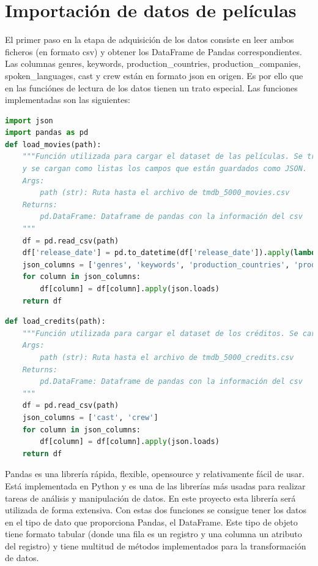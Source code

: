 \newpage
\section{Importación de datos de películas}

El primer paso en la etapa de adquisición de los datos consiste en leer ambos ficheros (en formato csv) y obtener los DataFrame de Pandas correspondientes. Las columnas genres, keywords, production\_countries, production\_companies, spoken\_languages, cast y crew están en formato json en origen. Es por ello que en las funciónes de lectura de los datos tienen un trato especial. Las funciones implementadas son las siguientes:

\begin{lstlisting}[language=Python, caption=Lectura de los datos del fichero de películas.]
import json
import pandas as pd
def load_movies(path):
    """Función utilizada para cargar el dataset de las películas. Se transforma a fecha el campo de fecha de salida
    y se cargan como listas los campos que están guardados como JSON.
    Args:
        path (str): Ruta hasta el archivo de tmdb_5000_movies.csv
    Returns:
        pd.DataFrame: Dataframe de pandas con la información del csv
    """
    df = pd.read_csv(path)
    df['release_date'] = pd.to_datetime(df['release_date']).apply(lambda x: x.date())
    json_columns = ['genres', 'keywords', 'production_countries', 'production_companies', 'spoken_languages']
    for column in json_columns:
        df[column] = df[column].apply(json.loads)
    return df
\end{lstlisting}

\begin{lstlisting}[language=Python, caption=Lectura de los datos del fichero de créditos.]
def load_credits(path):
    """Función utilizada para cargar el dataset de los créditos. Se cargan como listas los campos que están guardado
    Args:
        path (str): Ruta hasta el archivo de tmdb_5000_credits.csv
    Returns:
        pd.DataFrame: Dataframe de pandas con la información del csv
    """
    df = pd.read_csv(path)
    json_columns = ['cast', 'crew']
    for column in json_columns:
        df[column] = df[column].apply(json.loads)
    return df
\end{lstlisting}

Pandas es una librería rápida, flexible, opensource y relativamente fácil de usar. Está implementada en Python y es una de las librerías más usadas para realizar tareas de análisis y manipulación de datos. En este proyecto esta librería será utilizada de forma extensiva. Con estas dos funciones se consigue tener los datos en el tipo de dato que proporciona Pandas, el DataFrame. Este tipo de objeto tiene formato tabular (donde una fila es un registro y una columna un atributo del registro) y tiene multitud de métodos implementados para la transformación de datos.\\

